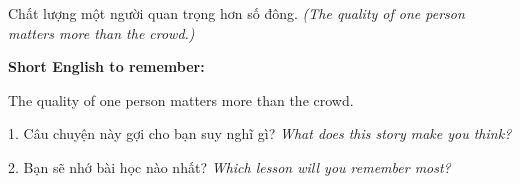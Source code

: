 \begin{baihoc}
Chất lượng một người quan trọng hơn số đông.
\textit{(The quality of one person matters more than the crowd.)}
\end{baihoc}

\begin{ghinhoanh}
\textbf{Short English to remember:}

The quality of one person matters more than the crowd.

\end{ghinhoanh}

\begin{tuhocnhanh}
1. Câu chuyện này gợi cho bạn suy nghĩ gì? \textit{What does this story make you think?}

2. Bạn sẽ nhớ bài học nào nhất? \textit{Which lesson will you remember most?}
\end{tuhocnhanh}
\ngancach

